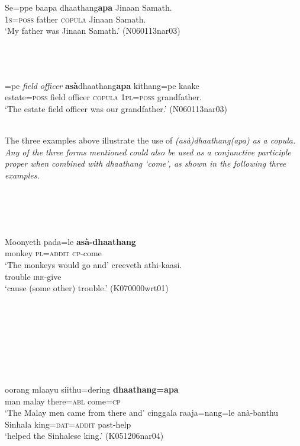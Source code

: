 \documentclass[a4paper,12pt]{article}
\newcommand{\xbox}[2]{\noindent\parbox[t]{#1}{#2}\noindent}
\newcommand{\trs}[2]{{\em #1\em} `#2'}
\newcommand{\ea}{\\\\}
\newcommand{\z}{\\\\}
\begin{document}
\xbox{\textwidth}{
\ea\label{ex:intro:copula:dhaathangapa}
\gll Se=ppe    baapa  dhaathang\textbf{apa}  Jinaan Samath. \\
     \textsc{1s}=\textsc{poss} father \textsc{copula} Jinaan Samath. \\
    `My father was Jinaan Samath.' (N060113nar03)
\z
}


\xbox{\textwidth}{
\ea\label{ex:intro:copula:asadhaathangapa}
\gll {\em Estate}=pe {\em field} {\em officer} \textbf{asà}dhaathang\textbf{apa}  kithang=pe     kaake\\
     estate=\textsc{poss} field officer \textsc{copula} \textsc{1pl}=\textsc{poss} grandfather. \\
    `The estate field officer was our grandfather.' (N060113nar03)
\z
}



The three examples above illustrate the use of \em (asà)dhaathang(apa) \em as a copula. Any of the three forms mentioned could also be used as a conjunctive participle proper when combined with \trs{dhaathang}{come}, as shown in the following three examples.


\xbox{\textwidth}{
\ea\label{ex:intro:cp:asdhaathang}
\ea
\gll Moonyeth pada=le \textbf{asà-dhaathang}\\
  monkey \textsc{pl}=\textsc{addit} \textsc{cp}-come \\
`The monkeys would go and'
\ex
\gll creeveth  athi-kaasi. \\
       trouble \textsc{irr}-give\\
    `cause (some other) trouble.'  (K070000wrt01)
\z
\z    
}
% 



\xbox{\textwidth}{
\ea\label{ex:intro:cp:dhaathangapa} 
\ea
\gll oorang mlaayu siithu=dering  \textbf{dhaathang=apa}\\
     man malay there=\textsc{abl} come=\textsc{cp} \\
    `The Malay men came from there and'  
\ex
\gll  cinggala  raaja=nang=le  anà-banthu\\
      Sinhala king=\textsc{dat}=\textsc{addit} past-help \\
    `helped the Sinhalese king.' (K051206nar04)

\z
\z
} 
\end{document}

